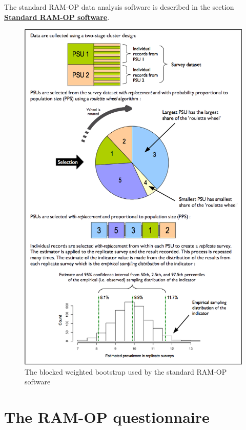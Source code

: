 \documentclass[12pt,a4paper]{book}
\theoremstyle{definition}
\theoremstyle{definition}
\theoremstyle{definition}
\theoremstyle{remark}
\begin{document}
The standard RAM-OP data analysis software is described in the section
\protect\hyperlink{software}{\textbf{Standard RAM-OP software}}.

\begin{figure}[H]

{\centering \includegraphics[width=800pt]{figures/bbw} 

}

\caption{The blocked weighted bootstrap used by the standard RAM-OP software}\label{fig:indicators31}
\end{figure}

\hypertarget{questionnaire}{%
\chapter{The RAM-OP questionnaire}\label{questionnaire}}
\end{document}
